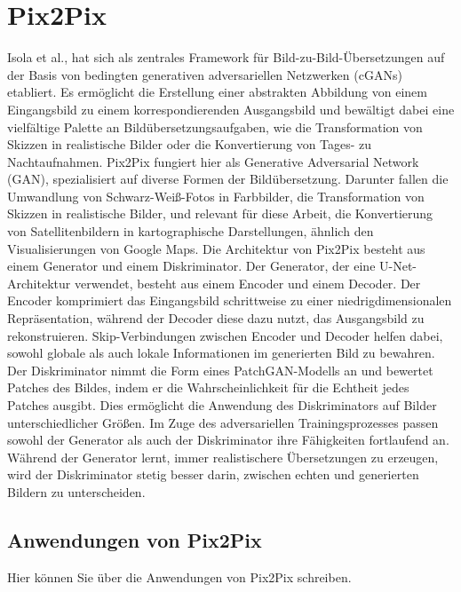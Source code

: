 \section{Pix2Pix}
Isola et al., hat sich als zentrales Framework für Bild-zu-Bild-Übersetzungen auf der Basis von bedingten generativen adversariellen Netzwerken (cGANs) etabliert. Es ermöglicht die Erstellung einer abstrakten Abbildung von einem Eingangsbild zu einem korrespondierenden Ausgangsbild und bewältigt dabei eine vielfältige Palette an Bildübersetzungsaufgaben, wie die Transformation von Skizzen in realistische Bilder oder die Konvertierung von Tages- zu Nachtaufnahmen. \newline
Pix2Pix fungiert hier als Generative Adversarial Network (GAN), spezialisiert auf diverse Formen der Bildübersetzung. Darunter fallen die Umwandlung von Schwarz-Weiß-Fotos in Farbbilder, die Transformation von Skizzen in realistische Bilder, und relevant für diese Arbeit, die Konvertierung von Satellitenbildern in kartographische Darstellungen, ähnlich den Visualisierungen von Google Maps. \newline	Die Architektur von Pix2Pix besteht aus einem Generator und einem Diskriminator. Der Generator, der eine U-Net-Architektur verwendet, besteht aus einem Encoder und einem Decoder. Der Encoder komprimiert das Eingangsbild schrittweise zu einer niedrigdimensionalen Repräsentation, während der Decoder diese dazu nutzt, das Ausgangsbild zu rekonstruieren. Skip-Verbindungen zwischen Encoder und Decoder helfen dabei, sowohl globale als auch lokale Informationen im generierten Bild zu bewahren. \newline
Der Diskriminator nimmt die Form eines PatchGAN-Modells an und bewertet Patches des Bildes, indem er die Wahrscheinlichkeit für die Echtheit jedes Patches ausgibt. Dies ermöglicht die Anwendung des Diskriminators auf Bilder unterschiedlicher Größen. Im Zuge des adversariellen Trainingsprozesses passen sowohl der Generator als auch der Diskriminator ihre Fähigkeiten fortlaufend an. Während der Generator lernt, immer realistischere Übersetzungen zu erzeugen, wird der Diskriminator stetig besser darin, zwischen echten und generierten Bildern zu unterscheiden.
  



\subsection{Anwendungen von Pix2Pix}
Hier können Sie über die Anwendungen von Pix2Pix schreiben.

